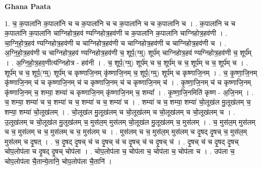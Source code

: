 \documentclass[17pt]{extarticle}
\begin{document}
\textbf{Ghana Paata } \newline

1. च॒ क॒पाला॑नि क॒पाला॑नि च च क॒पाला॑नि च च क॒पाला॑नि च च क॒पाला॑नि च । . क॒पाला॑नि च च क॒पाला॑नि क॒पाला॑नि चाग्निहोत्र॒हव॑ ण्यग्निहोत्र॒हव॑णी च क॒पाला॑नि क॒पाला॑नि चाग्निहोत्र॒हव॑णी । . चा॒ग्नि॒हो॒त्र॒हव॑ ण्यग्निहोत्र॒हव॑णी च चाग्निहोत्र॒हव॑णी च चाग्निहोत्र॒हव॑णी च चाग्निहोत्र॒हव॑णी च । . अ॒ग्नि॒हो॒त्र॒हव॑णी च चाग्निहोत्र॒हव॑ ण्यग्निहोत्र॒हव॑णी च॒ शूर्प॒(ग्म्॒) शूर्प॑म् चाग्निहोत्र॒हव॑ ण्यग्निहोत्र॒हव॑णी च॒ शूर्प᳚म् । . अ॒ग्नि॒हो॒त्र॒हव॒णीत्य॑ग्निहोत्र - हव॑नी । . च॒ शूर्प॒(ग्म्॒) शूर्प॑म् च च॒ शूर्प॑म् च च॒ शूर्प॑म् च च॒ शूर्प॑म् च । . शूर्प॑म् च च॒ शूर्प॒(ग्म्॒) शूर्प॑म् च कृष्णाजि॒नम् कृ॑ष्णाजि॒नम् च॒ शूर्प॒(ग्म्॒) शूर्प॑म् च कृष्णाजि॒नम् । . च॒ कृ॒ष्णा॒जि॒नम् कृ॑ष्णाजि॒नम् च॑ च कृष्णाजि॒नम् च॑ च कृष्णाजि॒नम् च॑ च कृष्णाजि॒नम् च॑ । . कृ॒ष्णा॒जि॒नम् च॑ च कृष्णाजि॒नम् कृ॑ष्णाजि॒नम् च॒ शम्या॒ शम्या॑ च कृष्णाजि॒नम् कृ॑ष्णाजि॒नम् च॒ शम्या᳚ । . कृ॒ष्णा॒जि॒नमिति॑ कृष्ण - अ॒जि॒नम् । . च॒ शम्या॒ शम्या॑ च च॒ शम्या॑ च च॒ शम्या॑ च च॒ शम्या॑ च । . शम्या॑ च च॒ शम्या॒ शम्या॑ चो॒लूख॑ल मु॒लूख॑लम् च॒ शम्या॒ शम्या॑ चो॒लूख॑लम् । . चो॒लूख॑ल मु॒लूख॑लम् च चो॒लूख॑लम् च चो॒लूख॑लम् च चो॒लूख॑लम् च । . उ॒लूख॑लम् च चो॒लूख॑ल मु॒लूख॑लम् च॒ मुस॑ल॒म् मुस॑लम् चो॒लूख॑ल मु॒लूख॑लम् च॒ मुस॑लम् । . च॒ मुस॑ल॒म् मुस॑लम् च च॒ मुस॑लम् च च॒ मुस॑लम् च च॒ मुस॑लम् च । . मुस॑लम् च च॒ मुस॑ल॒म् मुस॑लम् च दृ॒षद् दृ॒षच् च॒ मुस॑ल॒म् मुस॑लम् च दृ॒षत् । . च॒ दृ॒षद् दृ॒षच् च॑ च दृ॒षच् च॑ च दृ॒षच् च॑ च दृ॒षच् च॑ । . दृ॒षच् च॑ च दृ॒षद् दृ॒षच् चोप॒लोप॑ला च दृ॒षद् दृ॒षच् चोप॑ला । . चोप॒लोप॑ला च॒ चोप॑ला च॒ चोप॑ला च॒ चोप॑ला च । . उप॑ला च॒ चोप॒लोप॑ला चै॒तान्ये॒तानि॒ चोप॒लोप॑ला चै॒तानि॑ । \newline
\end{document}
